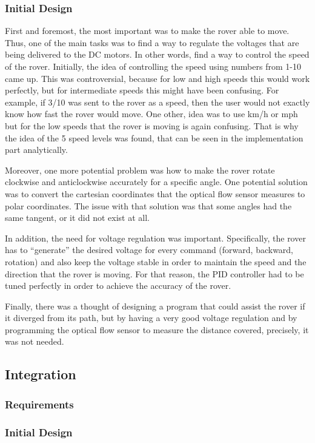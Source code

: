 \documentclass[a4paper]{article}
\begin{document}
\subsubsection{Initial Design}
First and foremost, the most important was to make the rover able to move. Thus, one of the main tasks was to find a way to regulate the voltages that are being delivered to the DC motors. In other words, find a way to control the speed of the rover. Initially, the idea of controlling the speed using numbers from 1-10 came up. This was controversial, because for low and high speeds this would work perfectly, but for intermediate speeds this might have been confusing. For example, if 3/10 was sent to the rover as a speed, then the user would not exactly know how fast the rover would move. One other, idea was to use km/h or mph but for the low speeds that the rover is moving is again confusing. That is why the idea of the 5 speed levels was found, that can be seen in the implementation part analytically. 

Moreover, one more potential problem was how to make the rover rotate clockwise and anticlockwise accurately for a specific angle. One potential solution was to convert the cartesian coordinates that the optical flow sensor measures to polar coordinates. The issue with that solution was that some angles had the same tangent, or it did not exist at all. 

In addition, the need for voltage regulation was important. Specifically, the rover has to “generate” the desired voltage for every command (forward, backward, rotation) and also keep the voltage stable in order to maintain the speed and the direction that the rover is moving. For that reason, the PID controller had to be tuned perfectly in order to achieve the accuracy of the rover.

Finally, there was a thought of designing a program that could assist the rover if it diverged from its path, but by having a very good voltage regulation and by programming the optical flow sensor to measure the distance covered, precisely, it was not needed. 



\subsection{Integration}
\subsubsection{Requirements}
\subsubsection{Initial Design}
\end{document}

